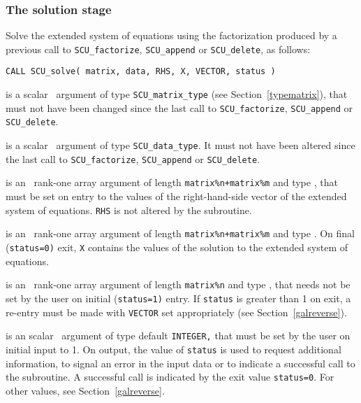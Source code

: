 \documentclass{galahad}
\newcommand{\packagename}{SCU}
\begin{document}

\subsubsection{The solution stage}
Solve the extended system of equations using 
the  factorization produced by a previous call to  
{\tt \packagename\_factorize}, {\tt \packagename\_append} 
or {\tt \packagename\_delete}, 
as follows: 
\vspace*{1mm}

\hskip0.5in 
{\tt CALL \packagename\_solve( matrix, data, RHS, X, VECTOR, status )}

\vspace*{-2mm}
\begin{description}
 is a scalar \intentin\ argument of type 
{\tt \packagename\_matrix\_type} 
(see Section~\ref{typematrix}), that must not have been changed since the 
last call to 
{\tt \packagename\_factorize}, {\tt \packagename\_append} or 
{\tt \packagename\_delete}. 
 
 is a scalar \intentinout\ argument of type 
{\tt \packagename\_data\_type}. 
It must not have been altered since the last call to  
{\tt \packagename\_factorize}, 
{\tt \packagename\_append} or 
{\tt \packagename\_delete}. 
 
 is an \intentin\ rank-one array argument of length  
{\tt matrix\%n+matrix\%m} 
and type \realdp, 
that must be set on entry to the values of the right-hand-side vector 
of the extended 
system of equations. {\tt RHS} is not altered by the subroutine. 
 
 is an \intentout\ rank-one array argument of length  
{\tt matrix\%n+matrix\%m} 
and type \realdp. 
On final ({\tt status=0)} exit, {\tt X} contains the values of the solution 
to the extended system of equations. 
 
 is an \intentinout\ rank-one array argument of length 
{\tt matrix\%n} 
and type \realdp, that needs not be set by 
the user on initial ({\tt status=1)} entry. If {\tt status} is greater than 
1 on exit, a re-entry must be made with {\tt VECTOR} set appropriately 
(see Section~\ref{galreverse}). 
 
 is an scalar \intentinout\ argument of type default 
{\tt INTEGER,} that  
must be set by the user on initial input to 1. On output, the value of 
{\tt status} 
is used to request additional information, to signal an error 
in the input data or to indicate a successful call to the subroutine. 
A successful call is indicated by the exit value {\tt status=0}. 
For other values, see Section~\ref{galreverse}. 

\end{description}
\end{document}
